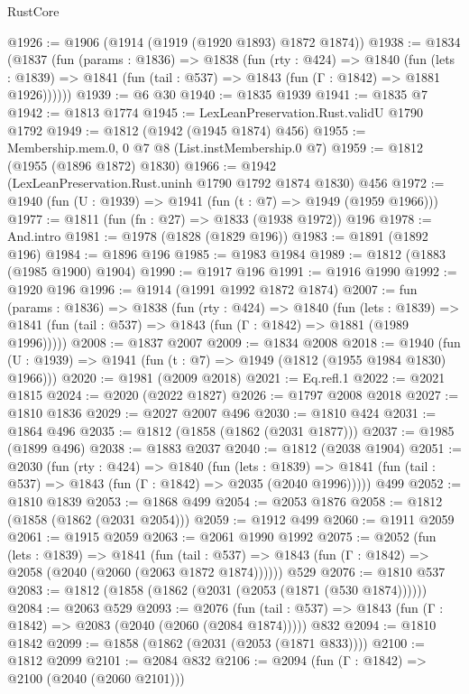 \begin{lexlean}{RustCore}
\begin{coremodule}
@1926 := @1906 (@1914 (@1919 (@1920 @1893) @1872 @1874))
@1938 := @1834
    (@1837
      (fun (params : @1836) =>
      @1838
        (fun (rty : @424) =>
        @1840
          (fun (lets : @1839) =>
          @1841 (fun (tail : @537) => @1843 (fun (Γ : @1842) => @1881 @1926))))))
@1939 := @6 @30
@1940 := @1835 @1939
@1941 := @1835 @7
@1942 := @1813 @1774
@1945 := LexLeanPreservation.Rust.validU @1790 @1792
@1949 := @1812 (@1942 (@1945 @1874) @456)
@1955 := Membership.mem.{0, 0} @7 @8 (List.instMembership.{0} @7)
@1959 := @1812 (@1955 (@1896 @1872) @1830)
@1966 := @1942 (LexLeanPreservation.Rust.uninh @1790 @1792 @1874 @1830) @456
@1972 := @1940 (fun (U : @1939) => @1941 (fun (t : @7) => @1949 (@1959 @1966)))
@1977 := @1811 (fun (fn : @27) => @1833 (@1938 @1972)) @196
@1978 := And.intro
@1981 := @1978 (@1828 (@1829 @196))
@1983 := @1891 (@1892 @196)
@1984 := @1896 @196
@1985 := @1983 @1984
@1989 := @1812 (@1883 (@1985 @1900) @1904)
@1990 := @1917 @196
@1991 := @1916 @1990
@1992 := @1920 @196
@1996 := @1914 (@1991 @1992 @1872 @1874)
@2007 := fun (params : @1836) =>
  @1838
    (fun (rty : @424) =>
    @1840
      (fun (lets : @1839) =>
      @1841 (fun (tail : @537) => @1843 (fun (Γ : @1842) => @1881 (@1989 @1996)))))
@2008 := @1837 @2007
@2009 := @1834 @2008
@2018 := @1940 (fun (U : @1939) => @1941 (fun (t : @7) => @1949 (@1812 (@1955 @1984 @1830) @1966)))
@2020 := @1981 (@2009 @2018)
@2021 := Eq.refl.{1}
@2022 := @2021 @1815
@2024 := @2020 (@2022 @1827)
@2026 := @1797 @2008 @2018
@2027 := @1810 @1836
@2029 := @2027 @2007 @496
@2030 := @1810 @424
@2031 := @1864 @496
@2035 := @1812 (@1858 (@1862 (@2031 @1877)))
@2037 := @1985 (@1899 @496)
@2038 := @1883 @2037
@2040 := @1812 (@2038 @1904)
@2051 := @2030
    (fun (rty : @424) =>
    @1840
      (fun (lets : @1839) =>
      @1841 (fun (tail : @537) => @1843 (fun (Γ : @1842) => @2035 (@2040 @1996)))))
    @499
@2052 := @1810 @1839
@2053 := @1868 @499
@2054 := @2053 @1876
@2058 := @1812 (@1858 (@1862 (@2031 @2054)))
@2059 := @1912 @499
@2060 := @1911 @2059
@2061 := @1915 @2059
@2063 := @2061 @1990 @1992
@2075 := @2052
    (fun (lets : @1839) =>
    @1841
      (fun (tail : @537) => @1843 (fun (Γ : @1842) => @2058 (@2040 (@2060 (@2063 @1872 @1874))))))
    @529
@2076 := @1810 @537
@2083 := @1812 (@1858 (@1862 (@2031 (@2053 (@1871 (@530 @1874))))))
@2084 := @2063 @529
@2093 := @2076
    (fun (tail : @537) => @1843 (fun (Γ : @1842) => @2083 (@2040 (@2060 (@2084 @1874)))))
    @832
@2094 := @1810 @1842
@2099 := @1858 (@1862 (@2031 (@2053 (@1871 @833))))
@2100 := @1812 @2099
@2101 := @2084 @832
@2106 := @2094 (fun (Γ : @1842) => @2100 (@2040 (@2060 @2101)))

\end{coremodule}
\end{lexlean}
